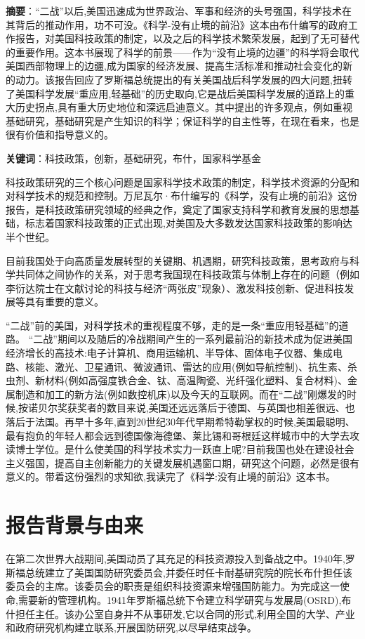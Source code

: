 \textbf{摘要}：“二战”以后,美国迅速成为世界政治、军事和经济的头号强国，科学技术在其背后的推动作用，功不可没。《科学-没有止境的前沿》这本由布什编写的政府工作报告，对美国科技政策的制定，以及之后的科学技术繁荣发展，起到了无可替代的重要作用。这本书展现了科学的前景——作为“没有止境的边疆”的科学将会取代美国西部物理上的边疆,成为国家的经济发展、提高生活标准和推动社会变化的新的动力。该报告回应了罗斯福总统提出的有关美国战后科学发展的四大问题,扭转了美国科学发展“重应用,轻基础”的历史取向,它是战后美国科学发展的道路上的重大历史拐点,具有重大历史地位和深远启迪意义。其中提出的许多观点，例如重视基础研究，基础研究是产生知识的科学；保证科学的自主性等，在现在看来，也是很有价值和指导意义的。

\textbf{关键词}：科技政策，创新，基础研究，布什，国家科学基金

科技政策研究的三个核心问题是国家科学技术政策的制定，科学技术资源的分配和对科学技术的规范和控制。万尼瓦尔·布什编写的《科学，没有止境的前沿》这份报告，是科技政策研究领域的经典之作，奠定了国家支持科学和教育发展的思想基础，标志着国家科技政策的正式出现,对美国及大多数发达国家科技政策的影响达半个世纪。

目前我国处于向高质量发展转型的关键期、机遇期，研究科技政策，思考政府与科学共同体之间协作的关系，对于思考我国现在科技政策与体制上存在的问题（例如李衍达院士在文献\cite{ref3}讨论的科技与经济“两张皮”现象）、激发科技创新、促进科技发展等具有重要的意义。

“二战”前的美国，对科学技术的重视程度不够，走的是一条“重应用轻基础”的道路\cite{ref2}。
“二战”期间以及随后的冷战期间产生的一系列最前沿的新技术成为促进美国经济增长的高技术:电子计算机、商用运输机、半导体、固体电子仪器、集成电路、核能、激光、卫星通讯、微波通讯、雷达的应用(例如导航控制)、抗生素、杀虫剂、新材料(例如高强度铁合金、钛、高温陶瓷、光纤强化塑料、复合材料)、金属制造和加工的新方法(例如数控机床)以及今天的互联网。而在“二战”刚爆发的时候,按诺贝尔奖获奖者的数目来说,美国还远远落后于德国、与英国也相差很远、也落后于法国。再早十多年,直到20世纪30年代早期希特勒掌权的时候,美国最聪明、最有抱负的年轻人都会远到德国像海德堡、莱比锡和哥根廷这样城市中的大学去攻读博士学位。是什么使美国的科学技术实力一跃直上呢?目前我国也处在建设社会主义强国，提高自主创新能力的关键发展机遇窗口期，研究这个问题，必然是很有意义的。带着这份强烈的求知欲,我读完了《科学:没有止境的前沿》这本书。

\section{报告背景与由来}

在第二次世界大战期间,美国动员了其充足的科技资源投入到备战之中。1940年,罗斯福总统建立了美国国防研究委员会,并委任时任卡耐基研究院的院长布什担任该委员会的主席。该委员会的职责是组织科技资源来增强国防能力。为完成这一使命,需要新的管理机构。1941年罗斯福总统下令建立科学研究与发展局(OSRD),布什担任主任。该办公室自身并不从事研发,它以合同的形式,利用全国的大学、产业和政府研究机构建立联系,开展国防研究,以尽早结束战争。

